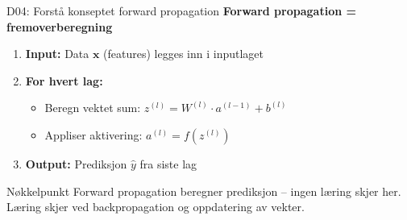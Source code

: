 \documentclass[aspectratio=169, 10pt]{beamer}
\begin{document}
\begin{frame}{D04: Forstå konseptet forward propagation}
    \textbf{Forward propagation = fremoverberegning}
    
    \begin{enumerate}
        \item \textbf{Input:} Data $\mathbf{x}$ (features) legges inn i inputlaget
        \item \textbf{For hvert lag:}
        \begin{itemize}
            \item Beregn vektet sum: $z^{(l)} = W^{(l)} \cdot a^{(l-1)} + b^{(l)}$
            \item Appliser aktivering: $a^{(l)} = f(z^{(l)})$
        \end{itemize}
        \item \textbf{Output:} Prediksjon $\hat{y}$ fra siste lag
    \end{enumerate}
    
    \vspace{0.3cm}
    \begin{center}
    \end{center}
    
    \vspace{0.3cm}
    \begin{block}{Nøkkelpunkt}
        Forward propagation beregner prediksjon -- ingen læring skjer her. Læring skjer ved backpropagation og oppdatering av vekter.
    \end{block}
\end{frame}
\end{document}
